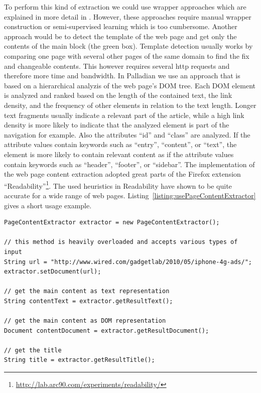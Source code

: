 \documentclass[a4paper,twoside]{book}      %
\begin{document}
To perform this kind of extraction we could use wrapper approaches which are explained in more detail in \cite{ckgs2006}. However, these approaches require manual wrapper construction or semi-supervised learning which is too cumbersome.
Another approach would be to detect the template of the web page and get only the contents of the main block (the green box). Template detection usually works by comparing one page with several other pages of the same domain to find the fix and changeable contents. This however requires several http requests and therefore more time and bandwidth.
In Palladian we use an approach that is based on a hierarchical analyzis of the web page's DOM tree. Each DOM element is analyzed and ranked based on the length of the contained text, the link density, and the frequency of other elements in relation to the text length. Longer text fragments usually indicate a relevant part of the article, while a high link density is more likely to indicate that the analyzed element is part of the navigation for example. Also the attributes ``id'' and ``class'' are analyzed. If the attribute values contain keywords such as ``entry'', ``content'', or ``text'', the element is more likely to contain relevant content as if the attribute values contain keywords such as ``header'', ``footer'', or ``sidebar''. The implementation of the web page content extraction adopted great parts of the Firefox extension ``Readability''\footnote{\url{http://lab.arc90.com/experiments/readability/}}. The used heuristics in Readability have shown to be quite accurate for a wide range of web pages. Listing~\ref{listing:usePageContentExtractor} gives a short usage example.

\begin{codelisting}
\begin{lstlisting}[label=listing:usePageContentExtractor,caption=Using the PageContentExtractor.,frame=tb]
PageContentExtractor extractor = new PageContentExtractor();

// this method is heavily overloaded and accepts various types of input
String url = "http://www.wired.com/gadgetlab/2010/05/iphone-4g-ads/";
extractor.setDocument(url);

// get the main content as text representation
String contentText = extractor.getResultText();

// get the main content as DOM representation
Document contentDocument = extractor.getResultDocument();

// get the title
String title = extractor.getResultTitle();
\end{lstlisting}
\end{codelisting}
\end{document}

